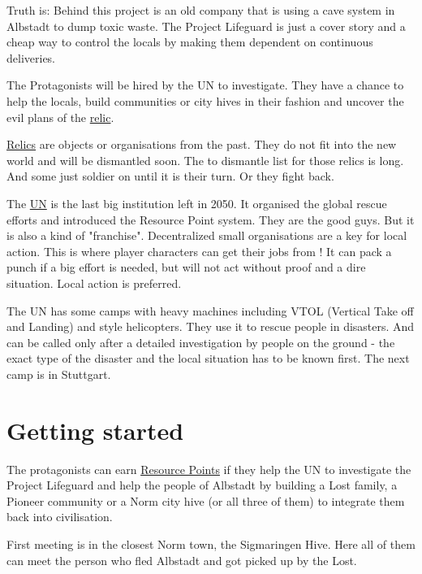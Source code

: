 Truth is: Behind this project is an old company that is using a cave system in Albstadt to dump toxic waste. The Project Lifeguard is just a cover story and a cheap way to control the locals by making them dependent on continuous deliveries.

The Protagonists will be hired by the UN to investigate. They have a chance to help the locals, build communities or city hives in their fashion and uncover the evil plans of the \hyperref[sec: Relic]{relic}.

\begin{sidebarBox}[title=Relics]
\hyperref[sec: Relic]{Relics} are objects or organisations from the past. They do not fit into the new world and will be dismantled soon. The to dismantle list for those relics is long. And some just soldier on until it is their turn. Or they fight back.
\end{sidebarBox}

\begin{sidebarBox}[title=UN]
The \hyperref[sec: UN]{UN} is the last big institution left in 2050. It organised the global rescue efforts and introduced the Resource Point system. They are the good guys.
But it is also a kind of "franchise". Decentralized small organisations are a key for local action. This is where player characters can get their jobs from !
It can pack a punch if a big effort is needed, but will not act without proof and a dire situation.
Local action is preferred.

The UN has some camps with heavy machines including VTOL (Vertical Take off and Landing) and style helicopters. They use it to rescue people in disasters. And can be called only after a detailed investigation by people on the ground - the exact type of the disaster and the local situation has to be known first. The next camp is in Stuttgart.
\end{sidebarBox}

\section{Getting started}

The protagonists can earn \hyperref[sec:Resource Points]{Resource Points} if they help the UN to investigate the Project Lifeguard and help the people of Albstadt by building a Lost family, a Pioneer community or a Norm city hive (or all three of them) to integrate them back into civilisation.

First meeting is in the closest Norm town, the Sigmaringen Hive. Here all of them can meet the person who fled Albstadt and got picked up by the Lost.

